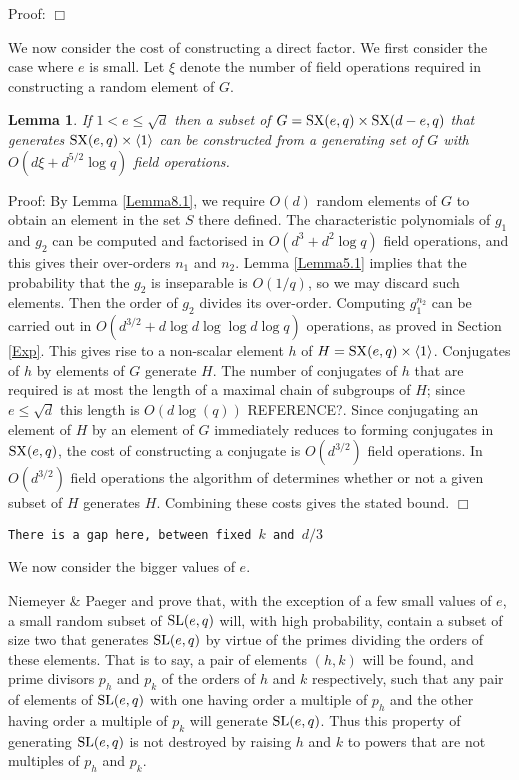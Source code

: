 \documentclass[12pt]{article}
\newtheorem{lemma}[definition]{Lemma}
\newenvironment{proof}{\normalsize {\sc Proof}:}{{\hfill $\Box$ \\}}
\def\SL{{\rm SL}}
\def\SX{{\rm SX}}
\begin{document}
\begin{proof}
\end{proof}

We now consider the cost of constructing a direct factor. 
We first consider the case where $e$ is small.
Let $\xi$ denote the number of field operations required in constructing a random element of $G$.
\begin{lemma}\label{Lemma8.2}  
If $1<e\le\sqrt{d}$  then a subset of $G=\SX(e,q)\times\SX(d-e,q)$ 
that generates $\SX(e,q)\times\langle1\rangle$ can be constructed   
from a generating set of $G$ with 
$O(d\xi + d^{5/2}\log q)$ field operations.
\end{lemma}
\begin{proof} 
By Lemma \ref{Lemma8.1}, we require $O(d)$ random
elements of $G$ to obtain an element in the set
$S$ there defined. The characteristic polynomials of $g_1$ and $g_2$
can be computed and factorised in $O(d^3 + d^2\log q)$ field operations, 
and this gives their over-orders $n_1$ and $n_2$. 
Lemma \ref{Lemma5.1} implies that the probability that the
 $g_2$ is inseparable is $O(1/q)$,
so we may discard such elements. Then the order of $g_2$ divides its
over-order. Computing $g_1^{n_2}$ can be carried out 
in $O(d^{3/2} + d\log d\log \log d \log q)$
operations, as proved in Section \ref{Exp}. This gives rise to a
non-scalar element $h$ of $H=\SX(e,q)\times\langle1\rangle$.
Conjugates of $h$ by elements of $G$ generate $H$. The number of
conjugates of $h$ that are required is at most the length of a maximal
chain of subgroups of $H$; since $e\le \sqrt{d}$ this length is
$O(d\log(q))$  REFERENCE?. Since conjugating an element
of $H$ by an element of $G$ immediately reduces to forming conjugates
in $\SX(e,q)$, the cost of constructing a conjugate is $O(d^{3/2})$ field
operations. In $O(d^{3/2})$ field operations the algorithm of \cite{NP} 
determines whether or not a given subset of $H$ generates $H$.
Combining these costs gives the stated bound.
\end{proof}

{\tt There is a gap here, between fixed $k$ and $d/3$}

We now consider the bigger values of $e$.
 
Niemeyer \& Paeger \cite{NP1} and \cite{NP2} prove that,
with the exception of a few small values of $e$, a small random subset
of $\SL(e,q)$ will, with high probability, contain a subset of size two that generates
$\SL(e,q)$ by virtue of the primes dividing the orders of these elements.
That is to say, a pair of elements $(h,k)$ will be found, and prime divisors $p_h$ and $p_k$
of the orders of $h$ and $k$ respectively, such that any pair of elements of $\SL(e,q)$ with
one having order a multiple of $p_h$ and the other having order a multiple of $p_k$
will generate $\SL(e,q)$.  Thus this property of generating $\SL(e,q)$ is not destroyed
by raising $h$ and $k$ to powers that are not multiples of $p_h$ and $p_k$.
\end{document}
